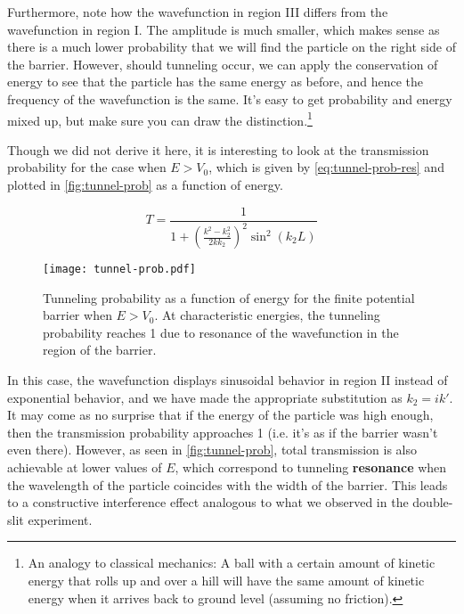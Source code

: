 Furthermore, note how the wavefunction in region III differs from the wavefunction in region I. 
The amplitude is much smaller, which makes sense as there is a much lower probability that we will find the particle on the right side of the barrier. 
However, should tunneling occur, we can apply the conservation of energy to see that the particle has the same energy as before, and hence the frequency of the wavefunction is the same. 
It's easy to get probability and energy mixed up, but make sure you can draw the distinction.\footnote{An analogy to classical mechanics: A ball with a certain amount of kinetic energy that rolls up and over a hill will have the same amount of kinetic energy when it arrives back to ground level (assuming no friction).} 

Though we did not derive it here, it is interesting to look at the transmission probability for the case when $E > V_0$, which is given by \autoref{eq:tunnel-prob-res} and plotted in \autoref{fig:tunnel-prob} as a function of energy.

\begin{equation}
	\boxed{T = \frac{1}{1 + \left(\frac{k^2-k_2^2}{2kk_2}\right)^2 \sin^2(k_2L)}} \label{eq:tunnel-prob-res}
\end{equation}

\begin{figure}[!h]
	\centering
	\texttt{[image: tunnel-prob.pdf]}
	\caption{Tunneling probability as a function of energy for the finite potential barrier when $E > V_0$. 
	At characteristic energies, the tunneling probability reaches 1 due to resonance of the wavefunction in the region of the barrier.}
	\label{fig:tunnel-prob}
\end{figure}

In this case, the wavefunction displays sinusoidal behavior in region II instead of exponential behavior, and we have made the appropriate substitution as $k_2 = ik'$. 
It may come as no surprise that if the energy of the particle was high enough, then the transmission probability approaches 1 (i.e. it's as if the barrier wasn't even there). 
However, as seen in \autoref{fig:tunnel-prob}, total transmission is also achievable at lower values of $E$, which correspond to tunneling \textbf{resonance} when the wavelength of the particle coincides with the width of the barrier. 
This leads to a constructive interference effect analogous to what we observed in the double-slit experiment.


